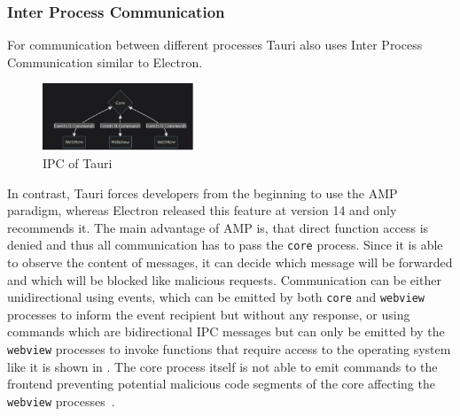 \subsubsection{Inter Process Communication}
For communication between different processes Tauri also uses Inter Process Communication similar to Electron.
\begin{figure}[ht]
    \centering
    \includegraphics[width=0.4\textwidth]{images/TauriArchitecture}
    \caption{IPC of Tauri~\cite[Figure 1-3]{tauri}}
    \label{fig:tauri:ipc}
\end{figure}
In contrast, Tauri forces developers from the beginning to use the \ac{AMP} paradigm, whereas Electron released this feature at version 14 and only recommends it.
The main advantage of \ac{AMP} is, that direct function access is denied and thus all communication has to pass the \texttt{core} process.
Since it is able to observe the content of messages, it can decide which message will be forwarded and which will be blocked like malicious requests.
Communication can be either unidirectional using events, which can be emitted by both \texttt{core} and \texttt{webview} processes to inform the event recipient but without any response,
or using commands which are bidirectional \ac{IPC} messages but can only be emitted by the \texttt{webview} processes to invoke functions that require access to the operating system like it is shown in .
The core process itself is not able to emit commands to the frontend preventing potential malicious code segments of the core affecting the \texttt{webview} processes~\cite{tauri}.

